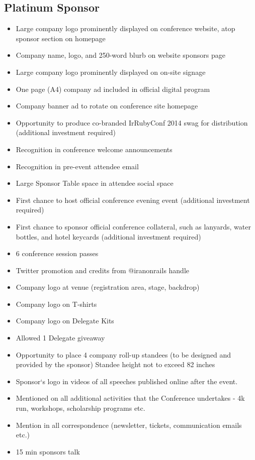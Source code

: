 \documentclass[a4paper,12pt]{article}
\begin{document}
\subsection*{Platinum Sponsor}
\begin{itemize}

\item{Large company logo prominently displayed on conference website, atop sponsor section on homepage}

\item{Company name, logo, and 250-word blurb on website sponsors page}

\item{Large company logo prominently displayed on on-site signage}

\item{One page (A4) company ad included in official digital program}

\item{Company banner ad to rotate on conference site homepage}
\item{Opportunity to produce co-branded IrRubyConf 2014 swag for distribution (additional investment required)}
\item{Recognition in conference welcome announcements}
\item{Recognition in pre-event attendee email}
\item{Large Sponsor Table space in attendee social space}
\item{First chance to host official conference evening event (additional investment required)}
\item{First chance to sponsor official conference collateral, such as lanyards, water bottles, and
  hotel keycards (additional investment required)}
\item{6 conference session passes}
\item{Twitter promotion and credits from @iranonrails handle}
\item{Company logo at venue (registration area, stage, backdrop)}
\item{Company logo on T-shirts}
\item{Company logo on Delegate Kits}
\item{Allowed 1 Delegate giveaway}
\item{Opportunity to place 4 company roll-up standees (to be designed and provided by the sponsor) Standee height not to exceed 82 inches}
\item{Sponsor`s logo in videos of all speeches published online after the event.}
\item{Mentioned on all additional activities that the Conference undertakes - 4k
  run, workshops, scholarship programs etc.}

\item{Mention in all correspondence (newsletter, tickets, communication emails
  etc.)}
\item{15 min sponsors talk}

\end{itemize}
\end{document}
